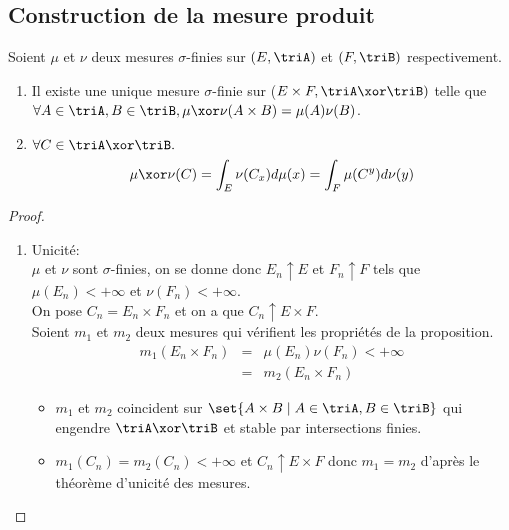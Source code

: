 \subsection{Construction de la mesure produit}

\begin{theorem}
	Soient $\mu$ et $\nu$ deux mesures $\sigma$-finies sur $(E, \triA)$ et $(F, \triB)$ respectivement.

	\begin{enumerate}
		\item Il existe une unique mesure $\sigma$-finie sur ($E \times F, \triA \xor \triB)$ telle que $\forall A \in \triA, B \in \triB, \mu \xor \nu(A \times B) = \mu(A) \nu(B)$.
		\item $\forall C \in \triA \xor \triB. $
		      $$ \mu \xor \nu(C) = \int_E \nu(C_x) d \mu(x) = \int_F \mu(C^y) d \nu(y) $$
	\end{enumerate}
\end{theorem}

\begin{proof}
	\begin{enumerate}
		\item  Unicité:\\
		      $\mu$ et $\nu$ sont $\sigma$-finies, on se donne donc $E_n \uparrow E$ et $F_n \uparrow F$ tels que $\mu(E_n) < +\infty$ et $\nu(F_n) < +\infty$.\\
		      On pose $C_n = E_n \times F_n$ et on a que $C_n \uparrow E \times F$.\\
		      Soient $m_1$ et $m_2$ deux mesures qui vérifient les propriétés de la proposition.\\
		      \begin{eqnarray*}
			      m_1(E_n \times F_n) &=& \mu(E_n) \nu(F_n) < +\infty \\
			      & = & m_2(E_n \times F_n)
		      \end{eqnarray*}

		      \begin{itemize}
			      \item $m_1$ et $m_2$ coincident sur $\set{A \times B \mid A \in \triA, B \in \triB}$ qui engendre $\triA \xor \triB$ et stable par intersections finies.
			      \item $m_1 (C_n) = m_2(C_n) < +\infty$ et $C_n \uparrow E \times F$ donc $m_1 = m_2$ d'après le théorème d'unicité des mesures.
		      \end{itemize}
	\end{enumerate}
\end{proof}

